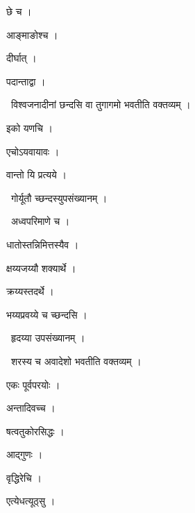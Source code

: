 \documentclass[10pt, openany, oneside]{book}
\begin{document}
\noindent छे च ।

\noindent आङ्माङोश्च ।

\noindent दीर्घात् ।

\noindent पदान्ताद्वा ।

\par\noindent\hspace{1.5em}{\vps वा॰}~{\qt विश्वजनादीनां छन्दसि वा तुगागमो भवतीति वक्तव्यम् ।}

\noindent इको यणचि ।

\noindent एचोऽयवायावः ।

\noindent वान्तो यि प्रत्यये ।

\par\noindent\hspace{1.5em}{\vps वा॰}~{\qt गोर्यूतौ च्छन्दस्युपसंख्यानम् ।}

\par\noindent\hspace{1.5em}{\vps वा॰}~{\qt अध्वपरिमाणे च ।}

\noindent धातोस्तन्निमित्तस्यैव ।

\noindent क्षय्यजय्यौ शक्यार्थे ।

\noindent क्रय्यस्तदर्थे ।

\noindent भय्यप्रवय्ये च च्छन्दसि ।

\par\noindent\hspace{1.5em}{\vps वा॰}~{\qt हृदय्या उपसंख्यानम् ।}

\par\noindent\hspace{1.5em}{\vps वा॰}~{\qt शरस्य च अवादेशो भवतीति वक्तव्यम् ।}

\noindent एकः पूर्वपरयोः ।

\noindent अन्तादिवच्च ।

\noindent षत्वतुकोरसिद्धः ।

\noindent आद्गुणः ।

\noindent वृद्धिरेचि ।

\noindent एत्येधत्यूठ्सु ।
\end{document}
